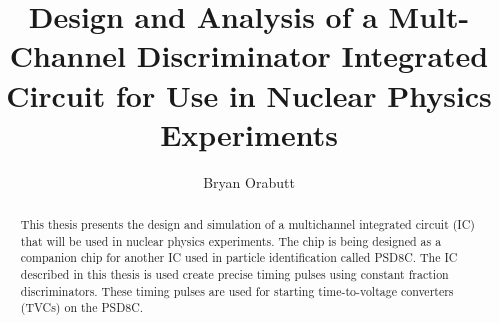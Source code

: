 \documentclass[12pt,oneside,final]{siuethesis}
\author{Bryan Orabutt}
\title{Design and Analysis of a Mult-Channel Discriminator Integrated Circuit for Use in Nuclear Physics Experiments}
\theoremstyle{definition}
\begin{document}
\maketitle 

\frontmatter %

\copyrightpage %



\begin{abstract}

\par This thesis presents the design and simulation of a multichannel integrated circuit (IC) that will be used in nuclear physics experiments. The chip is being designed as a companion chip for another IC used in particle identification called PSD8C. The IC described in this thesis is used create precise timing pulses using constant fraction discriminators. These timing pulses are used for starting time-to-voltage converters (TVCs) on the PSD8C.
\end{abstract}


\end{document}
